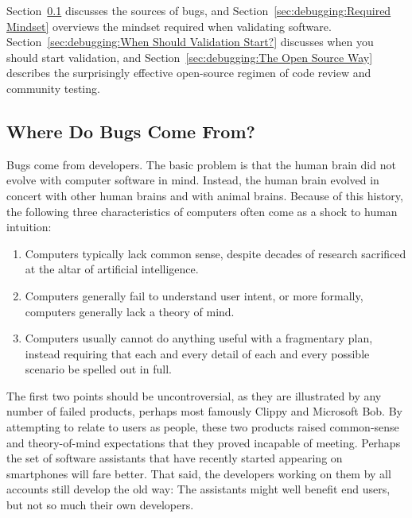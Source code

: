 Section~\ref{sec:debugging:Where Do Bugs Come From?}
discusses the sources of bugs, and
Section~\ref{sec:debugging:Required Mindset}
overviews the mindset required when validating software.
Section~\ref{sec:debugging:When Should Validation Start?}
discusses when you should start validation, and
Section~\ref{sec:debugging:The Open Source Way} describes the
surprisingly effective open-source regimen of code review and
community testing.

\subsection{Where Do Bugs Come From?}
\label{sec:debugging:Where Do Bugs Come From?}

Bugs come from developers.
The basic problem is that the human brain did not evolve with computer
software in mind.
Instead, the human brain evolved in concert with other human brains and
with animal brains.
Because of this history, the following three characteristics of computers
often come as a shock to human intuition:

\begin{enumerate}
\item	Computers typically lack common sense, despite decades of research
	sacrificed at the altar of artificial intelligence.
\item	Computers generally fail to understand user intent, or more
	formally, computers generally lack a theory of mind.
\item	Computers usually cannot do anything useful with a fragmentary plan,
	instead requiring that each and every detail of each and every
	possible scenario be spelled out in full.
\end{enumerate}

The first two points should be uncontroversial, as they are illustrated
by any number of failed products, perhaps most famously Clippy and
Microsoft Bob.
By attempting to relate to users as people, these two products raised
common-sense and theory-of-mind expectations that they proved incapable
of meeting.
Perhaps the set of software assistants that have recently started appearing
on smartphones will fare better.
That said, the developers working on them by all accounts still develop
the old way: The assistants might well benefit end users, but not so
much their own developers.

